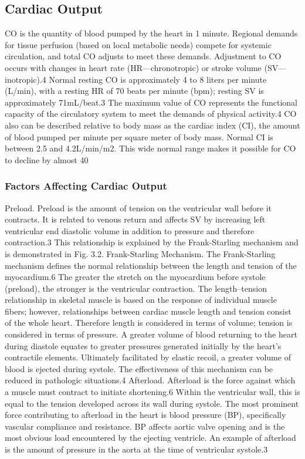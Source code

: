 \subsection{Cardiac Output}
CO is the quantity of blood pumped by the heart in 1 minute. Regional demands for tissue perfusion (based on local metabolic needs) compete for systemic circulation, and total CO adjusts to meet these demands. Adjustment to CO occurs with changes in heart rate (HR—chronotropic) or stroke volume (SV—inotropic).4 Normal resting CO is approximately 4 to 8 liters per minute (L/min), with a resting HR of 70 beats per minute (bpm); resting SV is approximately 71mL/beat.3 The maximum value of CO represents the functional capacity of the circulatory system to meet the demands of physical activity.4
CO also can be described relative to body mass as the cardiac index (CI), the amount of blood pumped per minute per square meter of body mass. Normal CI is between 2.5 and 4.2L/min/m2. This wide normal range makes it possible for CO to decline by almost 40%

\subsubsection{Factors Affecting Cardiac Output} 
Preload.
Preload is the amount of tension on the ventricular wall before it contracts. It is related to venous return and affects SV by increasing left ventricular end diastolic volume in addition to pressure and therefore contraction.3 This relationship is explained by the Frank-Starling mechanism and is demonstrated in Fig. 3.2.
Frank-Starling Mechanism.
The Frank-Starling mechanism defines the normal relationship between the length and tension of the myocardium.6 The greater the stretch on the myocardium before systole (preload), the stronger is the ventricular contraction. The length–tension relationship in skeletal muscle is based on the response of individual muscle fibers; however, relationships between cardiac muscle length and tension consist of the whole heart. Therefore length is considered in terms of volume; tension is considered in terms of pressure. A greater volume of blood returning to the heart during diastole equates to greater pressures generated initially by the heart’s contractile elements. Ultimately facilitated by elastic recoil, a greater volume of blood is ejected during systole. The effectiveness of this mechanism can be reduced in pathologic situations.4
Afterload.
Afterload is the force against which a muscle must contract to initiate shortening.6 Within the ventricular wall, this is equal to the tension developed across its wall during systole. The most prominent force contributing to afterload in the heart is blood pressure (BP), specifically vascular compliance and resistance. BP affects aortic valve opening and is the most obvious load encountered by the ejecting ventricle. An example of afterload is the amount of pressure in the aorta at the time of ventricular systole.3



